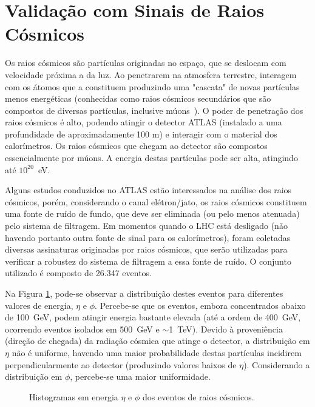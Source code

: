 \section{Validação com Sinais de Raios Cósmicos}

Os raios cósmicos \cite{book:cosmic:2002} são partículas
originadas no espaço, que se deslocam com velocidade próxima a da
luz. Ao penetrarem na atmosfera terrestre, interagem com os átomos
que a constituem produzindo uma "cascata" de novas partículas
menos energéticas (conhecidas como raios cósmicos secundários que
são compostos de diversas partículas, inclusive
múons~\cite{book:cosmicos:1990}). O poder de penetração dos raios
cósmicos é alto, podendo atingir o detector ATLAS (instalado a uma
profundidade de aproximadamente 100 m) e interagir com o material
dos calorímetros. Os raios cósmicos que chegam ao detector são
compostos essencialmente por múons. A energia destas partículas
pode ser alta, atingindo até $10^{20}$~eV.

Alguns estudos conduzidos no ATLAS estão interessados na análise
dos raios cósmicos, porém, considerando o canal elétron/jato, os
raios cósmicos constituem uma fonte de ruído de fundo, que deve
ser eliminada (ou pelo menos atenuada) pelo sistema de filtragem.
Em momentos quando o LHC está desligado (não havendo portanto
outra fonte de sinal para os calorímetros), foram coletadas
diversas assinaturas originadas por raios cósmicos, que serão
utilizadas para verificar a robustez do sistema de filtragem a
essa fonte de ruído. O conjunto utilizado é composto
de 26.347 eventos.

Na Figura \ref{fig_carcosmic}, pode-se observar a distribuição
destes eventos para diferentes valores de energia, $\eta$ e
$\phi$. Percebe-se que os eventos, embora concentrados abaixo de
100~GeV, podem atingir energia bastante elevada (até a ordem de
400~GeV, ocorrendo eventos isolados em 500~GeV e $\sim$1~TeV).
Devido à proveniência (direção de chegada) da radiação cósmica que
atinge o detector, a distribuição em $\eta$ não é uniforme,
havendo uma maior probabilidade destas partículas incidirem
perpendicularmente ao detector (produzindo valores baixos de
$\eta$). Considerando a distribuição em $\phi$, percebe-se uma
maior uniformidade.

\begin{figure}[h!]
\begin{minipage}[b]{0.48\linewidth}
  \centering
 \centerline{}
\end{minipage}
\hfill
\begin{minipage}[b]{0.48\linewidth}
  \centering
 \centerline{}
\end{minipage}
\hfill \linebreak
\begin{minipage}[b]{0.98\linewidth}
  \centering
 \centerline{}
\end{minipage}
\caption{Histogramas em energia $\eta$ e $\phi$ dos eventos de
raios cósmicos.}\label{fig_carcosmic}
\end{figure}

